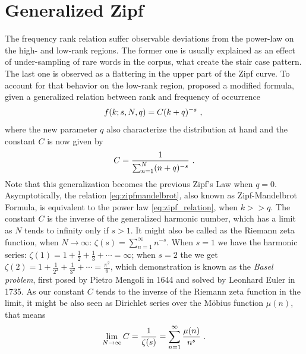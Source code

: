 \section{Generalized Zipf}
The frequency rank relation suffer observable deviations from the power-law on the high- and low-rank regions.
The former one is usually explained as an effect of under-sampling of rare words in the corpus,
what create the stair case pattern. The last one is observed as a flattering in the upper part 
of the Zipf curve. To account for that behavior on the low-rank region, \cite{mandelbrot1965}
proposed a modified formula, given a generalized relation between rank and frequency of occurrence
\begin{equation}
\label{eq:zipfmandelbrot}
f(k;s,N,q) = C (k+q)^{-s} \textmd{ , }
\end{equation}
where the new parameter $q$ also characterize the distribution at hand and
the constant $C$ is now given by
\begin{equation}
C = \frac{1}{\sum_{n=1}^{N} (n+q)^{-s}} \textmd{ .}
\end{equation}
Note that this generalization becomes the previous Zipf's Law when $q=0$.
Asymptotically, the relation \ref{eq:zipfmandelbrot}, also known as
Zipf-Mandelbrot Formula, is equivalent to the power law \ref{eq:zipf_relation}, when $k >> q$.
The constant $C$ is the inverse of the generalized harmonic number, which has a limit
as $N$ tends to infinity only if $s>1$. It might also be called as the Riemann zeta function,
when $N\rightarrow\infty$: $\zeta(s) = \sum_{n=1}^\infty n^{-s}$. When $s=1$ we have the harmonic
series: $\zeta(1) = 1 + \frac{1}{2} + \frac{1}{3} + \cdots = \infty$; when $s=2$ the 
we get $\zeta(2) = 1 + \frac{1}{2^2} + \frac{1}{3^2} + \cdots = \frac{\pi^2}{6}$, 
which demonstration is known as the \textit{Basel problem}, first posed by Pietro Mengoli in 1644 
and solved by Leonhard Euler in 1735.
As our constant $C$ tends to the inverse of the Riemann zeta function in the limit, it might be
also seen as Dirichlet series over the M\"obius function $\mu (n)$, that means
\begin{equation}
\lim_{N \rightarrow \infty} C = \frac{1}{\zeta(s)} = \sum_{n=1}^{\infty} \frac{\mu(n)}{n^s} \textmd{ .}
\end{equation}

